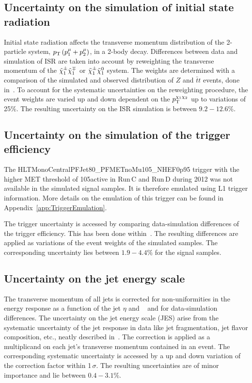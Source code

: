 \subsection*{Uncertainty on the simulation of initial state radiation}
Initial state radiation affects the transverse momentum distribution of the 2-particle system, $p_{\text{T}}\left(p_1^{\mu} + p_2^{\mu} \right)$, in a 2-body decay.
Differences between data and simulation of ISR are taken into account by reweighting the transverse momentum of the $\tilde{\chi}^{\pm}_{1}\tilde{\chi}^{\mp}_{1}$ or $\tilde{\chi}^{\pm}_{1}\tilde{\chi}^{0}_{1}$ system.
The weights are determined with a comparison of the simulated and observed \pt distribution of $Z$ and $\bar{t}t$ events, done in~\cite{bib:CMS:ISR_AN}.
To account for the systematic uncertainties on the reweighting procedure, the event weights are varied up and down dependent on the $p_{\text{T}}^{\chi_1\chi_2}$ up to variations of 25\%.
The resulting uncertainty on the ISR simulation is between $9.2-12.6\%$.

\subsection*{Uncertainty on the simulation of the trigger efficiency}
The HLTMonoCentralPFJet80\_PFMETnoMu105\_NHEF0p95 trigger with the higher MET threshold of 105\gev active in Run\,C and Run\,D during 2012 was not available in the simulated signal samples.
It is therefore emulated using L1 trigger information. 
More details on the emulation of this trigger can be found in Appendix~\ref{app:TriggerEmulation}.

The trigger uncertainty is accessed by comparing data-simulation differences of the trigger efficiency.
This has been done within~\cite{bib:CMS:DT_Thesis,bib:CMS:DT_8TeV_AN}.
The resulting differences are applied as variations of the event weights of the simulated samples.
The corresponding uncertainty lies between $1.9-4.4\%$ for the signal samples.

\subsection*{Uncertainty on the jet energy scale}
The transverse momentum of all jets is corrected for non-uniformities in the energy response as a function of the jet $\eta$ and \pt~\cite{bib:CMS:JME_PAS} and for data-simulation differences.
The uncertainty on the jet energy scale (JES) arise from the systematic uncertainty of the jet response in data like jet fragmentation, jet flavor composition, etc., neatly described in~\cite{bib:CMS:JME_PAS}.
The correction is applied as a multiplicand on each jet's transverse momentum contained in an event.
The corresponding systematic uncertainty is accessed by a up and down variation of the correction factor within 1\,$\sigma$.
The resulting uncertainties are of minor importance and lie between $0.4-3.1\%$.

